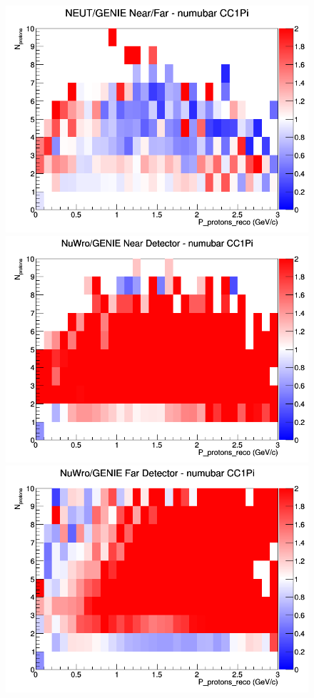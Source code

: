 \begin{figure}[h]
\endminipage
{}
\includegraphics[width=\linewidth]{eff_N_P/FGT/protons/ratios/CC1Pi_NEUT_GENIE_numubar_NF_N_P.png}
\endminipage
\newline
{}
\includegraphics[width=\linewidth]{eff_N_P/FGT/protons/ratios/CC1Pi_NuWro_GENIE_numubar_near_N_P.png}
\endminipage
{}
\includegraphics[width=\linewidth]{eff_N_P/FGT/protons/ratios/CC1Pi_NuWro_GENIE_numubar_far_N_P.png}

\end{figure}
